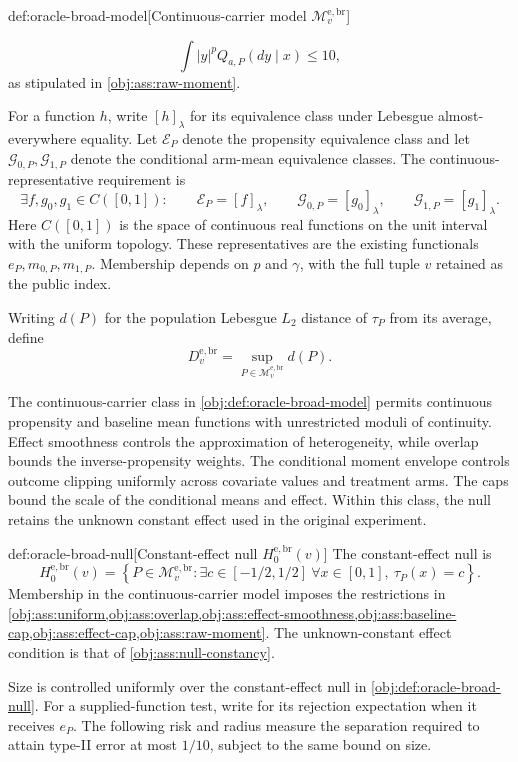 \documentclass[11pt]{article}
\begin{document}
\begin{definitionv}{def:oracle-broad-model}[Continuous-carrier model \(\mathcal M_v^{\mathrm{e,br}}\)]
\begin{itemize}
\[ \int |y|^p Q_{a,P}(dy\mid x)\le10,
\]
as stipulated in \cref{obj:ass:raw-moment}.
\end{itemize}
For a function \(h\), write \([h]_\lambda\) for its equivalence class under Lebesgue almost-everywhere equality. Let \(\mathcal E_P\) denote the propensity equivalence class and let \(\mathcal G_{0,P},\mathcal G_{1,P}\) denote the conditional arm-mean equivalence classes. The continuous-representative requirement is
\[
 \exists f,g_0,g_1\in C([0,1]):\qquad
 \mathcal E_P=[f]_\lambda,\qquad
 \mathcal G_{0,P}=[g_0]_\lambda,\qquad
 \mathcal G_{1,P}=[g_1]_\lambda.
\]
Here \(C([0,1])\) is the space of continuous real functions on the unit interval with the uniform topology. These representatives are the existing functionals \(e_P,m_{0,P},m_{1,P}\). Membership depends on \(p\) and \(\gamma\), with the full tuple \(v\) retained as the public index.

Writing \(d(P)\) for the population Lebesgue \(L_2\) distance of \(\tau_P\) from its average, define
\[
 D_v^{\mathrm{e,br}}=\sup_{P\in\mathcal M_v^{\mathrm{e,br}}}d(P).
\]
\end{definitionv}

The continuous-carrier class  in \cref{obj:def:oracle-broad-model} permits continuous propensity and baseline mean functions with unrestricted moduli of continuity. Effect smoothness controls the approximation of heterogeneity, while overlap bounds the inverse-propensity weights. The conditional moment envelope controls outcome clipping uniformly across covariate values and treatment arms. The caps bound the scale of the conditional means and effect. Within this class, the null retains the unknown constant effect used in the original experiment.

\begin{definitionv}{def:oracle-broad-null}[Constant-effect null \(H_0^{\mathrm{e,br}}(v)\)]
The constant-effect null is
\[
 H_0^{\mathrm{e,br}}(v)=
 \left\{P\in\mathcal M_v^{\mathrm{e,br}}:
 \exists c\in[-1/2,1/2]\ \forall x\in[0,1],\
 \tau_P(x)=c\right\}.
\]
Membership in the continuous-carrier model imposes the restrictions in
\cref{obj:ass:uniform,obj:ass:overlap,obj:ass:effect-smoothness,obj:ass:baseline-cap,obj:ass:effect-cap,obj:ass:raw-moment}.
The unknown-constant effect condition is that of \cref{obj:ass:null-constancy}.
\end{definitionv}

Size is controlled uniformly over the constant-effect null  in \cref{obj:def:oracle-broad-null}. For a supplied-function test, write  for its rejection expectation when it receives \(e_P\). The following risk and radius measure the separation required to attain type-II error at most \(1/10\), subject to the same bound on size.
\end{document}

